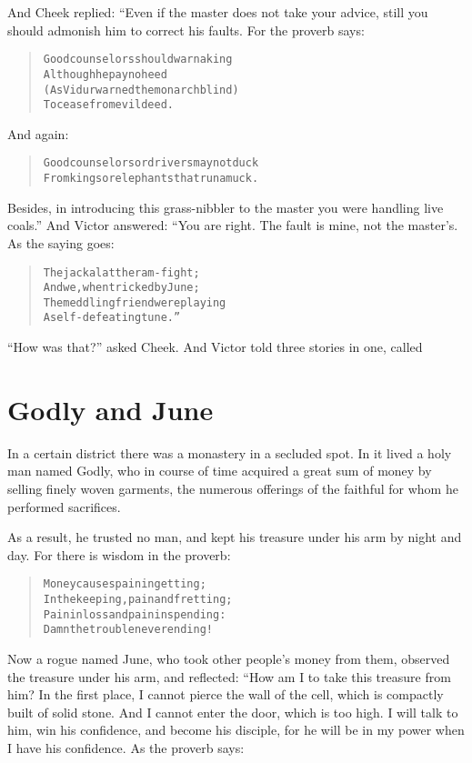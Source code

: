 \documentclass[article, twoside, 14pt]{memoir}
\renewenvironment{verbatim}{%
\begin{quote}%
\vskip -10pt%
\begin{alltt}\normalfont\large}{\end{alltt}%
\end{quote}%
\vskip -10pt
} %
\begin{document}
And Cheek replied: “Even if the master does not take your advice,
still you should admonish him to correct his faults. For the
proverb says:

\begin{verbatim}
Good counselors should warn a king
    Although he pay no heed
(As Vidur warned the monarch blind)
    To cease from evil deed.
\end{verbatim}
And again:

\begin{verbatim}
Good counselors or drivers may not duck
From kings or elephants that run amuck.
\end{verbatim}
Besides, in introducing this grass-nibbler to the master you were
handling live coals.” And Victor answered: “You are right. The
fault is mine, not the master's. As the saying goes:

\begin{verbatim}
The jackal at the ram-fight;
    And we, when tricked by June;
The meddling friend{\textemdash}were playing
    A self-defeating tune.”
\end{verbatim}
``How was that?'' asked Cheek. And Victor told three stories in
one, called

\chapter{Godly and June}

\label{s5}

In a certain district there was a monastery in a secluded
spot. In it lived a holy man named Godly, who in course of time
acquired a great sum of money by selling finely woven garments, the
numerous offerings of the faithful for whom he performed
sacrifices.

As a result, he trusted no man, and kept his treasure under his arm
by night and day. For there is wisdom in the proverb:

\begin{verbatim}
Money causes pain in getting;
In the keeping, pain and fretting;
Pain in loss and pain in spending:
Damn the trouble never ending!
\end{verbatim}
Now a rogue named June, who took other people's money from them,
observed the treasure under his arm, and reflected: “How am I to
take this treasure from him? In the first place, I cannot pierce
the wall of the cell, which is compactly built of solid stone. And
I cannot enter the door, which is too high. I will talk to him, win
his confidence, and become his disciple, for he will be in my power
when I have his confidence. As the proverb says:
\end{document}

